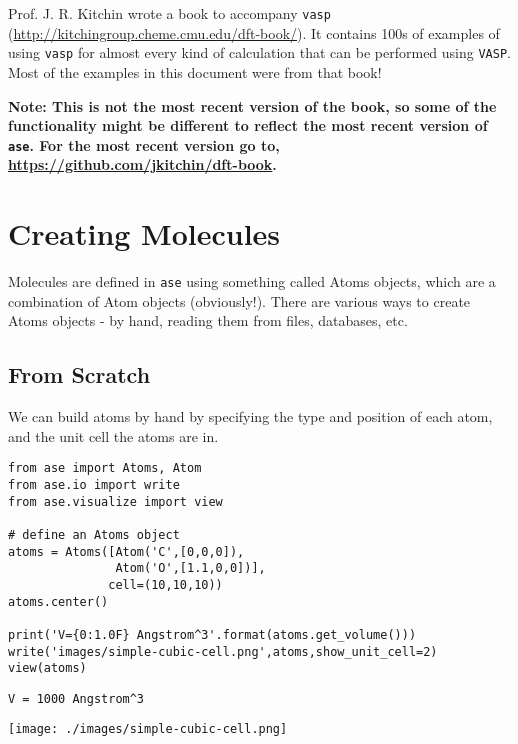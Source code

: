 \documentclass[11pt]{article}
\begin{document}
Prof. J. R. Kitchin wrote a book to accompany \texttt{vasp} (\url{http://kitchingroup.cheme.cmu.edu/dft-book/}). It contains 100s of examples of using \texttt{vasp} for almost every kind of calculation that can be performed using \texttt{VASP}. Most of the examples in this document were from that book!

\textbf{Note: This is not the most recent version of the book, so some of the functionality might be different to reflect the most recent version of \texttt{ase}. For the most recent version go to, \url{https://github.com/jkitchin/dft-book}.}


\section{Creating Molecules}
\label{sec:orge8b4646}

Molecules are defined in \texttt{ase} using something called Atoms objects, which are a combination of Atom objects (obviously!). There are various ways to create Atoms objects - by hand, reading them from files, databases, etc.

\subsection{From Scratch}
\label{sec:orgea9d749}

We can build atoms by hand by specifying the type and position of each atom, and the unit cell the atoms are in.

\begin{verbatim}
from ase import Atoms, Atom
from ase.io import write
from ase.visualize import view

# define an Atoms object
atoms = Atoms([Atom('C',[0,0,0]),
               Atom('O',[1.1,0,0])],
              cell=(10,10,10))
atoms.center()

print('V={0:1.0F} Angstrom^3'.format(atoms.get_volume()))
write('images/simple-cubic-cell.png',atoms,show_unit_cell=2)
view(atoms)
\end{verbatim}

\begin{verbatim}
V = 1000 Angstrom^3
\end{verbatim}

\begin{center}
\texttt{[image: ./images/simple-cubic-cell.png]}
\end{center}
\end{document}
